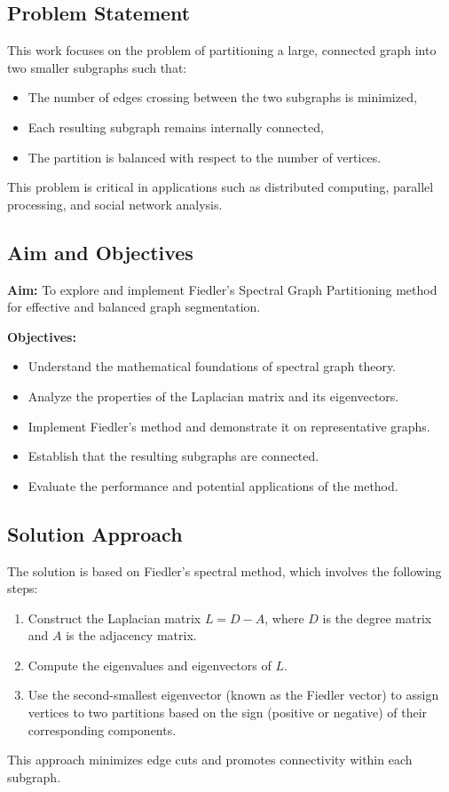 \documentclass[hidelinks,12pt]{article}
\begin{document}
\subsection{Problem Statement}
This work focuses on the problem of partitioning a large, connected graph into two smaller subgraphs such that:
\begin{itemize}
    \item The number of edges crossing between the two subgraphs is minimized,
    \item Each resulting subgraph remains internally connected,
    \item The partition is balanced with respect to the number of vertices.
\end{itemize}
This problem is critical in applications such as distributed computing, parallel processing, and social network analysis.

\subsection*{Aim and Objectives}
\textbf{Aim:} To explore and implement Fiedler's Spectral Graph Partitioning method for effective and balanced graph segmentation.

\vspace{0.5em}
\noindent\textbf{Objectives:}
\begin{itemize}
    \item Understand the mathematical foundations of spectral graph theory.
    \item Analyze the properties of the Laplacian matrix and its eigenvectors.
    \item Implement Fiedler’s method and demonstrate it on representative graphs.
    \item Establish that the resulting subgraphs are connected.
    \item Evaluate the performance and potential applications of the method.
\end{itemize}
\newpage

\subsection{Solution Approach}
The solution is based on Fiedler's spectral method, which involves the following steps:
\begin{enumerate}
    \item Construct the Laplacian matrix \( L = D - A \), where \( D \) is the degree matrix and \( A \) is the adjacency matrix.
    \item Compute the eigenvalues and eigenvectors of \( L \).
    \item Use the second-smallest eigenvector (known as the Fiedler vector) to assign vertices to two partitions based on the sign (positive or negative) of their corresponding components.
\end{enumerate}
This approach minimizes edge cuts and promotes connectivity within each subgraph.
\end{document}
